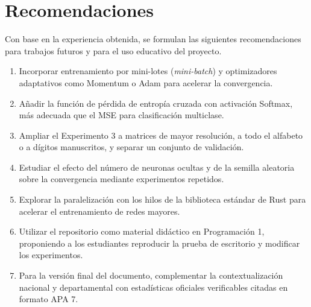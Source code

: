\chapter{Recomendaciones}\label{cap:recomendaciones}
Con base en la experiencia obtenida, se formulan las siguientes recomendaciones para trabajos futuros y para el uso educativo del proyecto.

\begin{enumerate}[leftmargin=2em,itemsep=4pt]
\item Incorporar entrenamiento por mini-lotes (\emph{mini-batch}) y optimizadores adaptativos como Momentum o Adam para acelerar la convergencia.
\item Añadir la función de pérdida de entropía cruzada con activación Softmax, más adecuada que el MSE para clasificación multiclase.
\item Ampliar el Experimento 3 a matrices de mayor resolución, a todo el alfabeto o a dígitos manuscritos, y separar un conjunto de validación.
\item Estudiar el efecto del número de neuronas ocultas y de la semilla aleatoria sobre la convergencia mediante experimentos repetidos.
\item Explorar la paralelización con los hilos de la biblioteca estándar de Rust para acelerar el entrenamiento de redes mayores.
\item Utilizar el repositorio como material didáctico en Programación 1, proponiendo a los estudiantes reproducir la prueba de escritorio y modificar los experimentos.
\item Para la versión final del documento, complementar la contextualización nacional y departamental con estadísticas oficiales verificables citadas en formato APA 7.
\end{enumerate}
